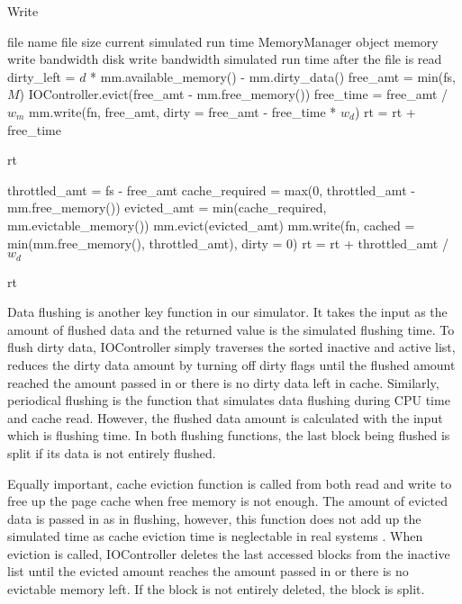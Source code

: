 \documentclass[conference]{IEEEtran}
\newcommand{\Desc}[2]{\State \makebox[2em][l]{#1}#2}
\begin{document}
			\begin{algorithm}\caption{Write}\label{alg:write}
				\small
				\begin{algorithmic}[1]
					\Input
        				\Desc{fn}{file name}
        				\Desc{fs}{file size}
						\Desc{rt}{current simulated run time}
						\Desc{mm}{MemoryManager object}
						\Desc{$w_m$}{memory write bandwidth}
						\Desc{$w_d$}{disk write bandwidth}
   					\EndInput
   					\Output
						\Desc{rt}{simulated run time after the file is read}
   					\EndOutput
					\State dirty\_left = $d$ * mm.available\_memory() - mm.dirty\_data()
   						\State free\_amt = min(fs, $M$) 
    					\State IOController.evict(free\_amt - mm.free\_memory())
    					\State free\_time = free\_amt / $w_m$
    					\State mm.write(fn, free\_amt, dirty = free\_amt - free\_time * $w_d$)
   						\State rt = rt + free\_time
    				\EndIf
					
						\Return rt
					\EndIf

					\State throttled\_amt = fs - free\_amt
					\State cache\_required = max(0, throttled\_amt  - mm.free\_memory())
					\State evicted\_amt = min(cache\_required, mm.evictable\_memory())
					\State mm.evict(evicted\_amt)
					\State mm.write(fn, cached = min(mm.free\_memory(), 
					throttled\_amt), dirty = 0)
					\State rt = rt + throttled\_amt /$w_d$

					\Return rt
					
				\end{algorithmic}
			\end{algorithm}	
			
			Data flushing is another key function in our simulator. It takes 
			the input as the amount of flushed data and the returned value is the 
			simulated flushing time. To flush dirty data, IOController simply 
			traverses the sorted inactive and active list, reduces the dirty data 
			amount by turning off dirty flags until the flushed amount reached 
			the amount passed in or there is no dirty data left in cache. 
			Similarly, periodical flushing is the function that simulates data flushing 
			during CPU time and cache read. However, the flushed data amount is 
			calculated with the input which is flushing time. In both flushing 
			functions, the last block being flushed is split if its data is not 
			entirely flushed.			
				
			Equally important, cache eviction function is called from both 
			read and write to free up the page cache when free memory 
			is not enough. The amount of evicted data is passed in as in flushing, 
			however, this function does not add up the simulated time as 
			cache eviction time is neglectable in real systems . When eviction 
			is called, IOController deletes the last accessed blocks from the 
			inactive list until the evicted amount reaches the amount passed in or 
			there is no evictable memory left. If the block is not entirely deleted, 
			the block is split.
			
\end{document}
